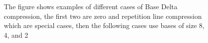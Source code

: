 \begin{figure}
    \label{fig:BaseDeltaCompression}
    \caption[Base Delta Compression Examples]{The figure shows examples of different cases of Base Delta compression, the first two are zero and repetition line compression which are special cases, then the following cases use bases of size 8, 4, and 2}
\end{figure}
